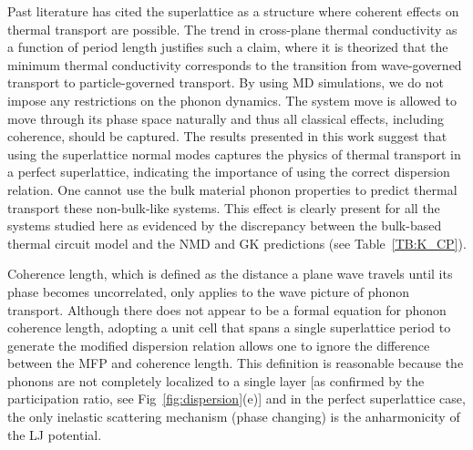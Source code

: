 \documentclass[aps,prb,preprint,preprintnumbers,amsmath,amssymb,floatfix,superscriptaddress]{revtex4}
\begin{document}

Past literature has cited the superlattice as a structure where coherent effects on thermal transport are possible. The trend in cross-plane thermal conductivity as a function of period length justifies such a claim,\cite{PhysRevB.67.195311,PhysRevB.72.174302,PhysRevB.61.3091} where it is theorized that the minimum thermal conductivity corresponds to the transition from wave-governed transport to particle-governed transport.\cite{PhysRevLett.84.927,PhysRevB.56.10754} %
By using MD simulations, we do not impose any restrictions on the phonon dynamics. The system move is allowed to move through its phase space naturally and thus all classical effects, including coherence, should be captured. The results presented in this work suggest that using the superlattice normal modes captures the physics of thermal transport in a perfect superlattice, indicating the importance of using the correct dispersion relation. One cannot use the bulk material phonon properties to predict thermal transport these non-bulk-like systems. This effect is clearly present for all the systems studied here as evidenced by the discrepancy between the bulk-based thermal circuit model and the NMD and GK predictions (see Table~\ref{TB:K_CP}).

Coherence length, which is defined as the distance a plane wave travels until its phase becomes uncorrelated, only applies to the wave picture of phonon transport. Although there does not appear to be a formal equation for phonon coherence length,\cite{chen2005nanoscale} adopting a unit cell that spans a single superlattice period to generate the modified dispersion relation allows one to ignore the difference between the MFP and coherence length.\cite{PhysRevB.67.195311} This definition is reasonable because the phonons are not completely localized to a single layer [as confirmed by the participation ratio, see Fig~\ref{fig:dispersion}(e)] and in the perfect superlattice case, the only inelastic scattering mechanism (phase changing) is the anharmonicity of the LJ potential. 
\end{document}
